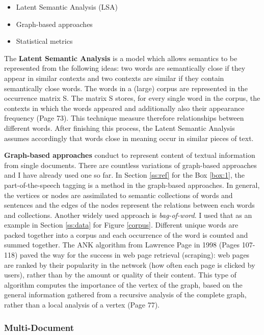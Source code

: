 \begin{itemize}
	\item Latent Semantic Analysis (LSA)
	\item Graph-based approaches
	\item Statistical metrics
\end{itemize}

The \textbf{Latent Semantic Analysis} \cite{Deerwester90indexingby} is a model which allows semantics to be represented from the following ideas: two words are semantically close if they appear in similar contexts and two contexts are similar if they contain semantically close words. The words in a (large) corpus are represented in the occurrence matrix S. The matrix S stores, for every single word in the corpus, the contexts in which the words appeared and additionally also their appearance frequency \cite{juan} (Page 73). This technique measure therefore relationships between different words. After finishing this process, the Latent Semantic Analysis assumes accordingly that words close in meaning occur in similar pieces of text.

\textbf{Graph-based approaches} conduct to represent content of textual information from single documents. There are countless variations of graph-based approaches and I have already used one so far. In Section \ref{ss:ref} for the Box \ref{box:1}, the part-of-the-speech tagging is a method in the graph-based approaches. In general, the vertices or nodes are assimilated to semantic collections of words and sentences and the edges of the nodes represent the relations between each words and collections. 
Another widely used approach is \textit{bag-of-word}. I used that as an example in Section \ref{ss:data} for Figure \ref{corpus}. Different unique words are packed together into a corpus and each occurrence of the word is counted and summed together. The ANK algorithm from Lawrence Page in 1998 \cite{brin1998anatomy} (Pages 107-118) paved the way for the success in web page retrieval (scraping): web pages are ranked by their popularity in the network (how often each page is clicked by users), rather than by the amount or quality of their content. This type of algorithm computes the importance of the vertex of the graph, based on the general information gathered from a recursive analysis of the complete graph, rather than a local analysis of a vertex \cite{juan} (Page 77).

\subsubsection{Multi-Document}\label{ss:multi}

